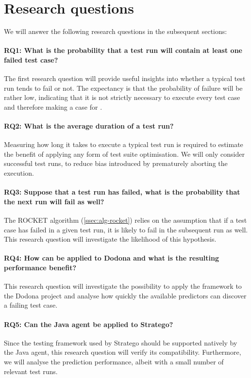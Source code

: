 
\section{Research questions}
We will answer the following research questions in the subsequent sections:

\paragraph*{RQ1: What is the probability that a test run will contain at least one failed test case?}
The first research question will provide useful insights into whether a typical test run tends to fail or not. The expectancy is that the probability of failure will be rather low, indicating that it is not strictly necessary to execute every test case and therefore making a case for \tsm{}.

\paragraph*{RQ2: What is the average duration of a test run?}
Measuring how long it takes to execute a typical test run is required to estimate the benefit of applying any form of test suite optimisation. We will only consider successful test runs, to reduce bias introduced by prematurely aborting the execution.

\paragraph*{RQ3: Suppose that a test run has failed, what is the probability that the next run will fail as well?}
The ROCKET algorithm (\cref{ssec:alg-rocket}) relies on the assumption that if a test case has failed in a given test run, it is likely to fail in the subsequent run as well. This research question will investigate the likelihood of this hypothesis.

\paragraph*{RQ4: How can \tcp{} be applied to Dodona and what is the resulting performance benefit?}
This research question will investigate the possibility to apply the \velocity{} framework to the Dodona project and analyse how quickly the available predictors can discover a failing test case.

\paragraph*{RQ5: Can the Java agent be applied to Stratego?}
Since the testing framework used by Stratego should be supported natively by the Java agent, this research question will verify its compatibility. Furthermore, we will analyse the prediction performance, albeit with a small number of relevant test runs.